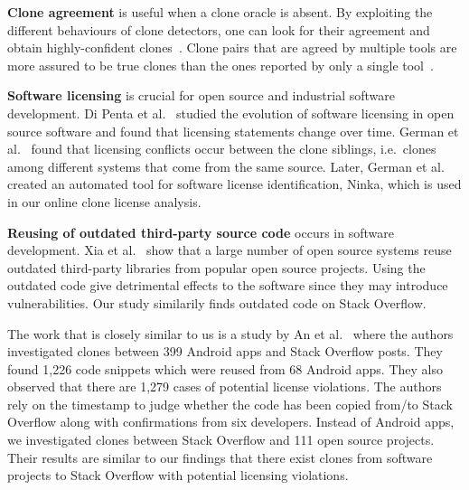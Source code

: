 \documentclass[10pt,journal,compsoc]{IEEEtran}
\begin{document}
\textbf{Clone agreement} is useful when a clone oracle is
absent. %
By exploiting the different behaviours of clone detectors,
one can look for their agreement and obtain
highly-confident clones~\cite{Bellon2007,Wang2013}. %
Clone pairs that are agreed by multiple tools are more assured to be true
clones than the ones reported by only a single
tool~\cite{Wang2013,cr2016ssbse,Funaro2010}. 

\textbf{Software licensing} is crucial for open source and 
industrial software development. Di Penta et al.~\cite{DiPenta2010}
studied the evolution of software licensing in open source 
software and found that licensing statements change over 
time. German et al.~\cite{German2009} found that licensing 
conflicts occur between the clone siblings, i.e.~clones among 
different systems that come from the same source. Later, 
German et al.~\cite{German2010} created an automated tool 
for software license identification, Ninka, which is used
in our online clone license analysis. 

\textbf{Reusing of outdated third-party source code} occurs 
in software development. Xia et al.~\cite{Xia2014} show that 
a large number of open source systems reuse outdated third-party 
libraries from popular open source projects. Using the outdated 
code give detrimental effects to the software since they may 
introduce vulnerabilities. Our study similarily finds
outdated code on Stack Overflow.

The work that is closely similar to us is a study by 
An et al.~\cite{An2017} where the authors investigated 
clones between 399 Android apps and Stack Overflow posts. 
They found 1,226 code snippets which were reused from 68 Android apps. 
They also observed that there are 1,279 cases of potential 
license violations. The authors rely on the timestamp to 
judge whether the code has been copied from/to Stack Overflow 
along with confirmations from six developers. Instead of Android apps, 
we investigated clones between Stack Overflow and 111 open 
source projects. Their results are similar to our findings that 
there exist clones from software projects to Stack Overflow with 
potential licensing violations. 
\end{document}
